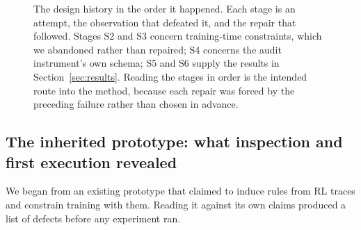 \documentclass[11pt,a4paper]{article}
\begin{document}
\begin{figure}[t]
\centering
{}
\caption{The design history in the order it happened. Each stage is an attempt, the observation that defeated it, and the repair that followed. Stages S2 and S3 concern training-time constraints, which we abandoned rather than repaired; S4 concerns the audit instrument's own schema; S5 and S6 supply the results in Section~\ref{sec:results}. Reading the stages in order is the intended route into the method, because each repair was forced by the preceding failure rather than chosen in advance.}
\label{fig:history}
\end{figure}

\subsection{The inherited prototype: what inspection and first execution revealed}
\label{sec:hist-prototype}

We began from an existing prototype that claimed to induce rules from RL traces and constrain training with them. Reading it against its own claims produced a list of defects before any experiment ran.
\end{document}
